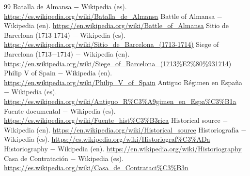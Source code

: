 \documentclass{book}
\begin{document}
\begin{thebibliography}{99}
 Batalla de Almansa \(-\) Wikipedia (es). \url{https://es.wikipedia.org/wiki/Batalla_de_Almansa}
 Battle of Almansa \(-\) Wikipedia (en). \url{https://en.wikipedia.org/wiki/Battle_of_Almansa}
 Sitio de Barcelona (1713-1714) \(-\) Wikipedia (es). \url{https://es.wikipedia.org/wiki/Sitio_de_Barcelona_(1713-1714)}
 Siege of Barcelona (1713\(-\)1714) \(-\) Wikipedia (en). \url{https://en.wikipedia.org/wiki/Siege_of_Barcelona_(1713%E2%80%931714)}
 Philip V of Spain \(-\) Wikipedia (en). \url{https://en.wikipedia.org/wiki/Philip_V_of_Spain}
 Antiguo Régimen en España \(-\) Wikipedia (es). \url{https://es.wikipedia.org/wiki/Antiguo_R%C3%A9gimen_en_Espa%C3%B1a}
 Fuente documental \(-\) Wikipedia (es). \url{https://es.wikipedia.org/wiki/Fuente_hist%C3%B3rica}
 Historical source \(-\) Wikipedia (en). \url{https://en.wikipedia.org/wiki/Historical_source}
 Historiografía \(-\) Wikipedia (es). \url{https://es.wikipedia.org/wiki/Historiograf%C3%ADa}
 Historiography \(-\) Wikipedia (en). \url{https://en.wikipedia.org/wiki/Historiography}
 Casa de Contratación \(-\) Wikipedia (es). \url{https://es.wikipedia.org/wiki/Casa_de_Contrataci%C3%B3n}
\end{thebibliography}
\end{document}
